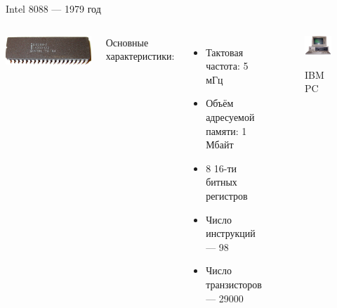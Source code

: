 \documentclass{beamer}
\begin{document}
    \begin{frame}{Intel 8088 --- 1979 год}
    \begin{columns}
    	\includegraphics[width=0.8\linewidth]{fig/Intel_8088.jpg}
    	\footnotesize

    	Основные характеристики:
    	\begin{itemize}
    		\item Тактовая частота: 5 мГц
    		\item Объём адресуемой памяти: 1 Мбайт
    		\item 8 16-ти битных регистров
    		\item Число инструкций --- 98
    		\item Число транзисторов --- 29000  
    	\end{itemize}
    	\begin{figure}
    		\includegraphics[width=\linewidth]{fig/IBM_PC.jpg}

    		IBM PC
    	\end{figure}
    \end{columns}
    \end{frame}
\end{document}
